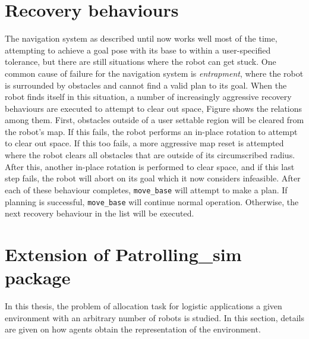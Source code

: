\section{Recovery behaviours}
The navigation system as described until now works well most of the time,
attempting to achieve a goal pose with its base to within a user-specified
tolerance, but there are still situations where the robot can get stuck.
One common cause of failure for the navigation system is \textit{entrapment},
where the robot is surrounded by obstacles and cannot find a valid plan to its goal.
When the robot finds itself in this situation, a number of increasingly
aggressive recovery behaviours are executed to attempt to clear out space,
Figure %
shows the relations among them. First, obstacles outside of a user 
settable region will be cleared from the robot’s map.
If this fails, the robot performs an in-place rotation to attempt to clear out
space. If this too fails, a more aggressive map reset is attempted where the
robot clears all obstacles that are outside of its circumscribed radius. After
this, another in-place rotation is performed to clear space, and if this last
step fails, the robot will abort on its goal which it now considers infeasible.
After each of these behaviour completes, \texttt{move\_base} will attempt to make
a plan. If planning is successful, \texttt{move\_base} will continue normal operation.
Otherwise, the next recovery behaviour in the list will be executed.

\section{Extension of Patrolling\_sim package}
In this thesis, the problem of allocation task for logistic applications a given 
environment with an arbitrary number of robots is studied. In this section, 
details are given on how agents obtain the representation of the environment.

